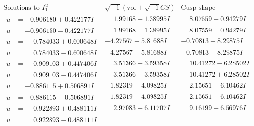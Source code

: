 \documentclass[1p]{elsarticle_modified}
\theoremstyle{definition}
\newcommand{\I}{\sqrt{-1}}
\begin{document}
$$\begin{array}{c|c|c}  
\text{Solutions to }I^u_{1}& \I (\text{vol} + \sqrt{-1}CS) & \text{Cusp shape}\\
 \hline 
\begin{aligned}
u &= -0.906180 + 0.422177 I\end{aligned}
 & \phantom{-}1.99168 + 1.38995 I & \phantom{-}8.07559 + 0.94279 I \\ \hline\begin{aligned}
u &= -0.906180 - 0.422177 I\end{aligned}
 & \phantom{-}1.99168 - 1.38995 I & \phantom{-}8.07559 - 0.94279 I \\ \hline\begin{aligned}
u &= \phantom{-}0.784033 + 0.600648 I\end{aligned}
 & -4.27567 + 5.81688 I & -0.70813 - 8.29875 I \\ \hline\begin{aligned}
u &= \phantom{-}0.784033 - 0.600648 I\end{aligned}
 & -4.27567 - 5.81688 I & -0.70813 + 8.29875 I \\ \hline\begin{aligned}
u &= \phantom{-}0.909103 + 0.447406 I\end{aligned}
 & \phantom{-}3.51366 + 3.59358 I & \phantom{-}10.41272 - 6.28502 I \\ \hline\begin{aligned}
u &= \phantom{-}0.909103 - 0.447406 I\end{aligned}
 & \phantom{-}3.51366 - 3.59358 I & \phantom{-}10.41272 + 6.28502 I \\ \hline\begin{aligned}
u &= -0.886115 + 0.506891 I\end{aligned}
 & -1.82319 - 4.09825 I & \phantom{-}2.15651 + 6.10462 I \\ \hline\begin{aligned}
u &= -0.886115 - 0.506891 I\end{aligned}
 & -1.82319 + 4.09825 I & \phantom{-}2.15651 - 6.10462 I \\ \hline\begin{aligned}
u &= \phantom{-}0.922893 + 0.488111 I\end{aligned}
 & \phantom{-}2.97083 + 6.11707 I & \phantom{-}9.16199 - 6.56976 I \\ \hline\begin{aligned}
u &= \phantom{-}0.922893 - 0.488111 I\end{aligned}

\end{array}$$
\end{document}
